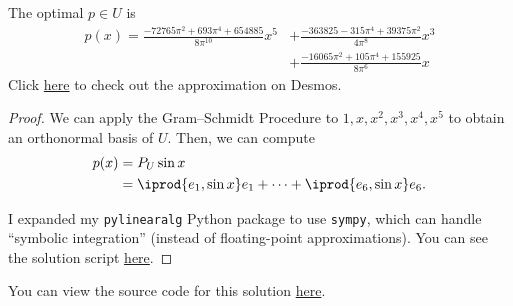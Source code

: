 \documentclass{amsart}
\newcommand{\pagenum}{202}
\newcommand{\probnum}{13}
\begin{document}
\begin{claim*}
The optimal $p\in U$ is
\begin{align*}
    p(x)=\frac{- 72765 \pi^{2} + 693 \pi^{4} + 654885}
    {8 \pi^{10}} x^{5}
    &+ \frac{-363825 - 315 \pi^{4} + 39375 \pi^{2}}
    {4 \pi^{8}} x^{3} \\
    &+ \frac{- 16065 \pi^{2}+ 105 \pi^{4} + 155925}{8 \pi^{6}} x
\end{align*}
Click \href{https://www.desmos.com/calculator/dldsdtkuav}{here}
to check out the approximation on Desmos.
\end{claim*}
\begin{proof}
We can apply
the Gram--Schmidt Procedure to $1,x,x^2,x^3,x^4,x^5$
to obtain an orthonormal basis of $U.$
Then, we can compute
\begin{align*}
    p(x) &= P_U\sin x \\
         &= \iprod{e_1,\sin x}e_1+\cdots+\iprod{e_6,\sin x}e_6.
\end{align*}

I expanded my \texttt{pylinearalg} Python package to use \texttt{sympy},
which can handle ``symbolic integration'' (instead of floating-point
approximations). You can see the solution script
\href{https://github.com/thomasbreydo/pylinearalg/blob/main/examples/page202_prob13.py}{here}.
\end{proof}

\vspace{0.5in}

\begin{note*}
You can view the source code for this solution
\href{https://github.com/thomasbreydo/linalg/blob/main/\pagenum_\probnum_Thomas_Breydo.tex}
{here}.
\end{note*}
\end{document}
